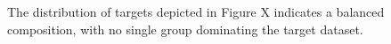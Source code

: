 The distribution of targets depicted in Figure X indicates a balanced composition, with no single group dominating the target dataset.











